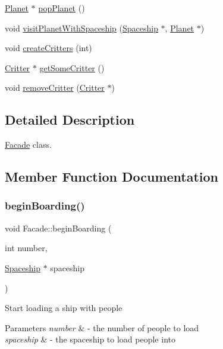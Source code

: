 \begin{DoxyCompactItemize}
\hyperlink{classPlanet}{Planet} $\ast$ \hyperlink{classFacade_a5519cbabe4e10ae5b904f9726133548b}{pop\+Planet} ()
\item 
void \hyperlink{classFacade_aebe418b146c51597d40684758830a476}{visit\+Planet\+With\+Spaceship} (\hyperlink{classSpaceship}{Spaceship} $\ast$, \hyperlink{classPlanet}{Planet} $\ast$)
\item 
void \hyperlink{classFacade_a2947cf249289176c61d53412f30eac14}{create\+Critters} (int)
\item 
\hyperlink{classCritter}{Critter} $\ast$ \hyperlink{classFacade_a9107be8f3d1f43ef4565e448608a89f8}{get\+Some\+Critter} ()
\item 
void \hyperlink{classFacade_aac0e65b823a1bbb8d824ff12c572144b}{remove\+Critter} (\hyperlink{classCritter}{Critter} $\ast$)
\end{DoxyCompactItemize}


\subsection{Detailed Description}
\hyperlink{classFacade}{Facade} class. 

\subsection{Member Function Documentation}
\mbox{\label{classFacade_a353ace75af9123f863869c57f9ba1e88}} 
\subsubsection{\texorpdfstring{begin\+Boarding()}{beginBoarding()}}
{\footnotesize\ttfamily void Facade\+::begin\+Boarding (\begin{DoxyParamCaption}\item[{int}]{number,  }\item[{\hyperlink{classSpaceship}{Spaceship} $\ast$}]{spaceship }\end{DoxyParamCaption})}

Start loading a ship with people 
\begin{DoxyParams}{Parameters}
{\em number} & -\/ the number of people to load \\
\hline
{\em spaceship} & -\/ the spaceship to load people into \\
\hline
\end{DoxyParams}
\mbox{\label{classFacade_adbdce0c4dbae689cc1eca07ff861483d}} 
